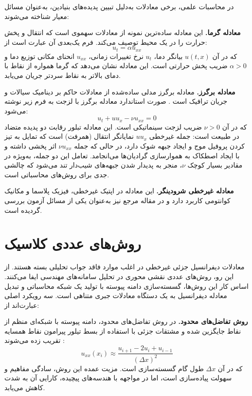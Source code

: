 در محاسبات علمی، برخی معادلات به‌دلیل تبیین پدیده‌های بنیادین، به‌عنوان مسائل معیار شناخته می‌شوند:

\textbf{معادله گرما.} این معادله ساده‌ترین نمونه از معادلات سهموی است که انتقال و پخش حرارت را در یک محیط توصیف می‌کند. فرم یک‌بعدی آن عبارت است از:
\begin{equation}
u_t = \alpha u_{xx}
\label{eq:heat}
\end{equation}
که در آن $u(t,x)$ بیانگر دما، $u_t$ نرخ تغییرات زمانی، $u_{xx}$ انحنای مکانی توزیع دما و $\alpha > 0$ ضریب پخش حرارتی است. این معادله نشان می‌دهد که گرما همواره از نقاط با دمای بالاتر به نقاط سردتر جریان می‌یابد.

\textbf{معادله برگرز.} معادله برگرز مدلی ساده‌شده از معادلات حاکم بر دینامیک سیالات و جریان ترافیک است \cite{hopf1950}. صورت استاندارد معادله برگرز با لزجت به فرم زیر نوشته می‌شود:
\begin{equation}
u_t + u u_x - \nu u_{xx} = 0
\label{eq:burgers-intro}
\end{equation}
که در آن $\nu > 0$ ضریب لزجت سینماتیکی است. این معادله تبلور رقابت دو پدیده متضاد در طبیعت است: جمله غیرخطی $u u_x$ نمایانگر انتقال (همرفت) است که تمایل به تیز کردن پروفیل موج و ایجاد جبهه شوک دارد، در حالی که جمله $\nu u_{xx}$ اثر پخشی داشته و با ایجاد اصطکاک به هموارسازی گرادیان‌ها می‌انجامد. تعامل این دو جمله، به‌ویژه در مقادیر بسیار کوچک $\nu$، منجر به پدیدار شدن جبهه‌های شیب‌دار تند می‌شود که چالشی جدی برای روش‌های محاسباتی است.

\textbf{معادله غیرخطی شرودینگر.} این معادله در اپتیک غیرخطی، فیزیک پلاسما و مکانیک کوانتومی کاربرد دارد و در مقاله مرجع \cite{raissi2019} نیز به‌عنوان یکی از مسائل آزمون بررسی گردیده است.

\section{روش‌های عددی کلاسیک}
\label{sec:classical}

معادلات دیفرانسیل جزئی غیرخطی در اغلب موارد فاقد جواب تحلیلی بسته هستند. از این رو، روش‌های عددی نقشی محوری در تحلیل سامانه‌های مهندسی ایفا می‌کنند. اساس کار این روش‌ها، گسسته‌سازی دامنه پیوسته با تولید یک شبکه محاسباتی و تبدیل معادله دیفرانسیل به یک دستگاه معادلات جبری متناهی است. سه رویکرد اصلی عبارت‌اند از:

\textbf{روش تفاضل‌های محدود.} در روش تفاضل‌های محدود، دامنه پیوسته با شبکه‌ای منظم از نقاط جایگزین شده و مشتقات جزئی با استفاده از بسط تیلور پیرامون نقاط همسایه تقریب زده می‌شوند \cite{leveque2007}:
\begin{equation}
u_{xx}(x_i) \approx \frac{u_{i+1} - 2u_i + u_{i-1}}{(\Delta x)^2}
\label{eq:fd}
\end{equation}
که در آن $\Delta x$ طول گام گسسته‌سازی است. مزیت عمده این روش، سادگی مفاهیم و سهولت پیاده‌سازی است، اما در مواجهه با هندسه‌های پیچیده، کارایی آن به شدت کاهش می‌یابد.

